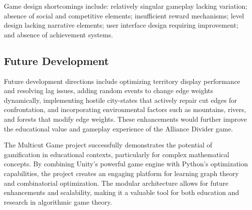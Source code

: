 \documentclass[english]{tudscrreprt}
\begin{document}
Game design shortcomings include: relatively singular gameplay lacking variation; absence of social and competitive elements; insufficient reward mechanisms; level design lacking narrative elements; user interface design requiring improvement; and absence of achievement systems.

\subsection{Future Development}
Future development directions include optimizing territory display performance and resolving lag issues, adding random events to change edge weights dynamically, implementing hostile city-states that actively repair cut edges for confrontation, and incorporating environmental factors such as mountains, rivers, and forests that modify edge weights. These enhancements would further improve the educational value and gameplay experience of the Alliance Divider game.

The Multicut Game project successfully demonstrates the potential of gamification in educational contexts, particularly for complex mathematical concepts. By combining Unity's powerful game engine with Python's optimization capabilities, the project creates an engaging platform for learning graph theory and combinatorial optimization. The modular architecture allows for future enhancements and scalability, making it a valuable tool for both education and research in algorithmic game theory.

\printbibliography[heading=bibintoc]\label{sec:bibliography}%
\end{document}
